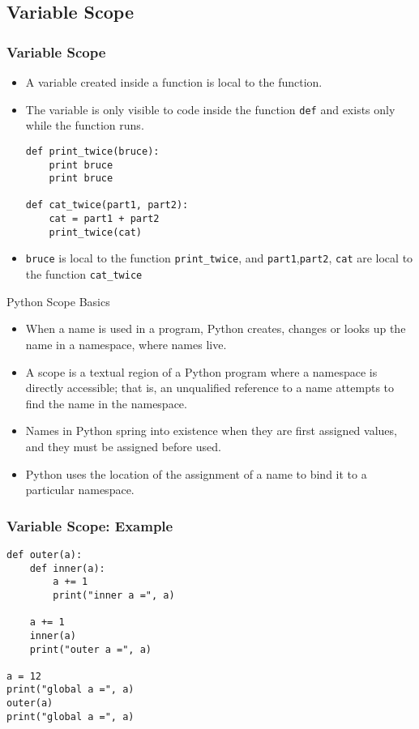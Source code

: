 \documentclass{beamer}
\begin{document}
\subsection{Variable Scope}


\begin{frame}[fragile]
\frametitle{Variable Scope}
\begin{itemize}
\item A variable created inside a function  is \alert{local} to the function.
\item The variable is only visible to code \alert{inside} the function \verb"def" and exists only while the function runs. 
\small
\begin{verbatim}
def print_twice(bruce):
    print bruce
    print bruce

def cat_twice(part1, part2):
    cat = part1 + part2
    print_twice(cat)
\end{verbatim}
\normalsize
\item \verb"bruce" is local to the function \verb"print_twice", and \verb"part1",\verb"part2", \verb"cat" are local to the function \verb"cat_twice"
\end{itemize}
\end{frame}


\begin{frame}{Python Scope Basics}
\begin{itemize}
\item When a name is used in a program, Python creates, changes or looks up the name in a \alert{namespace}, where names live.
 \item A \alert{scope} is a textual region of a Python program where a namespace is directly accessible; that is, an unqualified reference to a name attempts to find the name in the namespace.
\item Names in Python spring into existence when they are \alert{first assigned values}, and they must be assigned before used.
\item Python uses the \alert{ location of the assignment} of a name to bind it to a particular namespace.
\end{itemize}
\end{frame}

\begin{frame}[fragile]
\frametitle{Variable Scope: Example}

\begin{block}{}
\begin{verbatim}
def outer(a):
    def inner(a):
        a += 1
        print("inner a =", a)
     
    a += 1
    inner(a)
    print("outer a =", a)
 
a = 12
print("global a =", a)
outer(a)
print("global a =", a)
\end{verbatim}
\end{block}

\end{frame}
\end{document}
